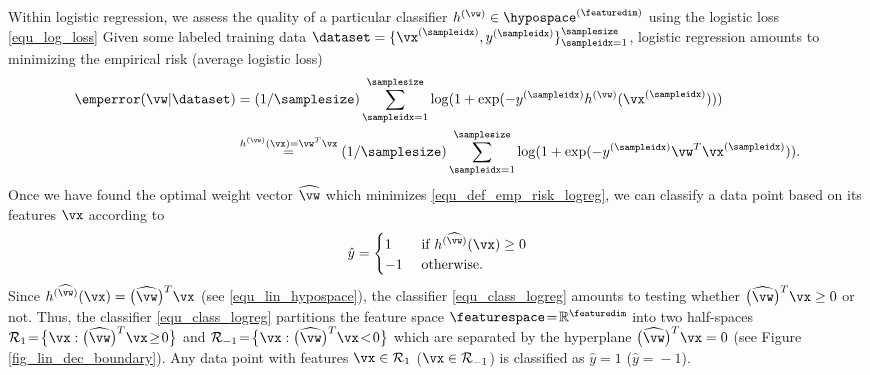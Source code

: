 \documentclass[12pt]{report}
\begin{document}
Within logistic regression, we assess the quality of a particular classifier $h^{(\vw)} \in \hypospace^{(\featuredim)}$ 
using the logistic loss \eqref{equ_log_loss} Given some labeled training data $\dataset =\{ \vx^{(\sampleidx)},y^{(\sampleidx)} \}_{\sampleidx=1}^{\samplesize}$, logistic regression amounts to minimizing the empirical risk (average logistic loss) 
\begin{align} 
\label{equ_def_emp_risk_logreg}
\emperror ( \vw | \dataset ) & = (1/\samplesize) \sum_{\sampleidx=1}^{\samplesize}  \log( 1+ \exp ( - y^{(\sampleidx)} h^{(\vw)}(\vx^{(\sampleidx)}))) \nonumber \\
& \stackrel{h^{(\vw)}(\vx)=\vw^{T} \vx}{=}  (1/\samplesize) \sum_{\sampleidx=1}^{\samplesize} \log( 1+ \exp ( - y^{(\sampleidx)} \vw^{T} \vx^{(\sampleidx)})).
\end{align} 
Once we have found the optimal weight vector $\widehat{\vw}$ which minimizes \eqref{equ_def_emp_risk_logreg}, 
we can classify a data point based on its features $\vx$ according to 
\begin{equation}
\label{equ_class_logreg}
\hat{y} =  \begin{cases} 1 & \mbox{ if } h^{(\widehat{\vw})}(\vx) \geq 0 \\ -1 & \mbox{ otherwise.} \end{cases}
\end{equation} 
Since $h^{(\widehat{\vw})}(\vx) = \big(\widehat{\vw}\big)^{T} \vx$ (see \eqref{equ_lin_hypospace}), 
the classifier \eqref{equ_class_logreg} amounts to testing whether $\big(\widehat{\vw}\big)^{T} \vx \geq 0$ 
or not. Thus, the classifier \eqref{equ_class_logreg} partitions the feature space $\featurespace\!=\!\mathbb{R}^{\featuredim}$ 
into two half-spaces $\mathcal{R}_{1}\!=\!\big\{ \vx: \big(\widehat{\vw}\big)^{T} \vx\!\geq\!0 \big\}$ and 
$\mathcal{R}_{-1}\!=\!\big\{ \vx: \big(\widehat{\vw}\big)^{T} \vx\!<\!0 \big\}$ which are separated by the 
hyperplane $\big(\widehat{\vw}\big)^{T} \vx =0$ (see Figure \ref{fig_lin_dec_boundary}). Any data point 
with features $\vx \in \mathcal{R}_{1}$ ($\vx \in \mathcal{R}_{-1}$) is classified as $\hat{y}\!=\!1$ ($\hat{y}\!=\!-1$). 
\end{document}
